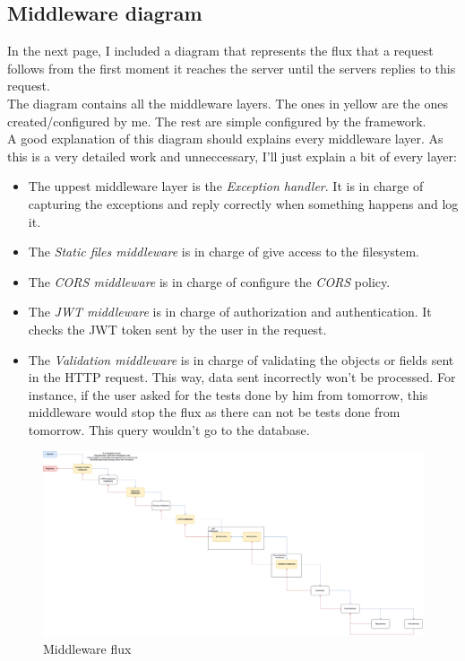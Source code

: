     \subsection{Middleware diagram}
        In the next page, I included a diagram that represents the flux that a request follows from the first moment it reaches the server until the servers replies to this request. \\

        The diagram contains all the middleware layers. The ones in yellow are the ones created/configured by me. The rest are simple configured by the framework. \\

        A good explanation of this diagram should explains every middleware layer. As this is a very detailed work and unneccessary, I'll just explain a bit of every layer:
        \begin{itemize}[noitemsep]
            \item The uppest middleware layer is the \textit{Exception handler}. It is in charge of capturing the exceptions and reply correctly when something happens and log it.
            \item The \textit{Static files middleware} is in charge of give access to the filesystem. \\
            \item The \textit{CORS middleware} is in charge of configure the \textit{CORS} policy. \\
            \item The \textit{JWT middleware} is in charge of authorization and authentication. It checks the {JWT token} sent by the user in the request. 
            \item The \textit{Validation middleware} is in charge of validating the objects or fields sent in the {HTTP request}. This way, data sent incorrectly won't be processed. For instance, if the user asked for the tests done by him from tomorrow, this middleware would stop the flux as there can not be tests done from tomorrow. This query wouldn't go to the database. 
        \end{itemize}
            \newpage
            \begin{figure}[H]
                \centering
                    \includegraphics[angle=90, width=\textwidth, height=\textheight]{assets/diagrams/middleware.png}
                \caption{Middleware flux}
                \label{fig:implementation_middleware}
            \end{figure}

